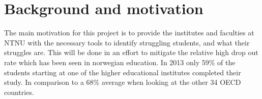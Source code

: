 \section{Background and motivation}
	The main motivation for this project is to provide the institutes and faculties at NTNU 
	with the necessary tools to identify struggling students, and what their struggles are.
	This will be done in an effort to mitigate the relative high drop out rate which has been
	seen in norwegian education. 
	In 2013 only 59\% of the students starting at one of the higher educational institutes completed their study.
	In comparison to a 68\% average when looking at the other 34 OECD countries.\cite{OECD2013}
	